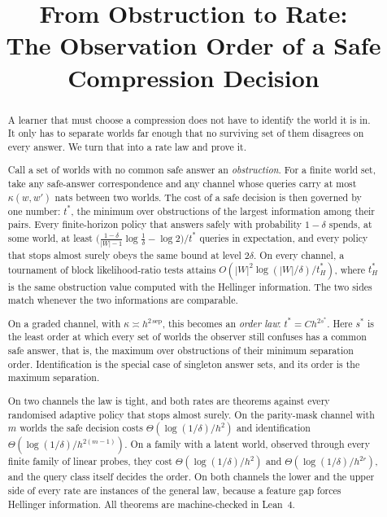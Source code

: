 



\title{From Obstruction to Rate:\\The Observation Order of a Safe Compression Decision}

\author{
}

\maketitle

\begin{abstract}
A learner that must choose a compression does not have to identify the world it is in. It
only has to separate worlds far enough that no surviving set of them disagrees on every
answer. We turn that into a rate law and prove it.

Call a set of worlds with no common safe answer an \emph{obstruction}. For a finite world
set, take any safe-answer correspondence and any channel whose queries carry at most
$\kappa(w,w')$ nats between two worlds. The cost of a safe decision is then governed by one
number: $t^{*}$, the minimum over obstructions of the largest information among their pairs.
Every finite-horizon policy that answers safely with probability $1-\delta$ spends, at some
world, at least $\bigl(\frac{1-\delta}{|W|-1}\log\frac1\delta-\log2\bigr)/t^{*}$ queries in
expectation, and every policy that stops almost surely obeys the same bound at level
$2\delta$. On every channel, a tournament of block likelihood-ratio tests attains
$O(|W|^{2}\log(|W|/\delta)/t^{*}_{H})$, where $t^{*}_{H}$ is the same obstruction value computed
with the Hellinger information. The two sides match whenever the two informations are
comparable.

On a graded channel, with $\kappa\asymp h^{2\,\mathrm{sep}}$, this becomes an \emph{order law}:
$t^{*}=Ch^{2s^{*}}$. Here $s^{*}$ is the least order at which every set of worlds the observer
still confuses has a common safe answer, that is, the maximum over obstructions of their
minimum separation order. Identification is the special case of singleton answer sets, and its
order is the maximum separation.

On two channels the law is tight, and both rates are theorems against every randomised adaptive
policy that stops almost surely. On the parity-mask channel with $m$ worlds the safe decision
costs $\Theta(\log(1/\delta)/h^{2})$ and identification $\Theta(\log(1/\delta)/h^{2(m-1)})$. On a
family with a latent world, observed through every finite family of linear probes, they cost
$\Theta(\log(1/\delta)/h^{2})$ and $\Theta(\log(1/\delta)/h^{2r})$, and the query class itself
decides the order. On both channels the lower and the upper side of every rate are instances of
the general law, because a feature gap forces Hellinger information. All theorems are
machine-checked in Lean~4.
\end{abstract}

